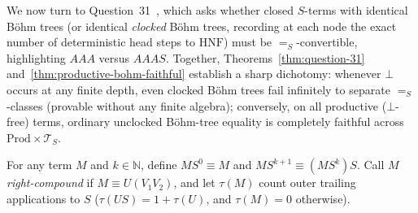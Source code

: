 \documentclass[11pt,reqno]{amsart}
\numberwithin{equation}{section}
\theoremstyle{plain}
\theoremstyle{definition}
\theoremstyle{remark}
\newcommand{\TS}{\mathcal{T}_S}
\newcommand{\HNF}{\mathrm{HNF}}
\newcommand{\Prod}{\mathrm{Prod}}
\newcommand{\convS}{=_S}
\begin{document}
We now turn to Question~31~\cite[p.~93]{BarendregtEndrullisKlopWaldmann2017}, which asks whether closed $S$-terms with identical B\"ohm trees (or identical \emph{clocked} B\"ohm trees, recording at each node the exact number of deterministic head steps to $\HNF$) must be $\convS$-convertible, highlighting $A A A$ versus $A A A S$. Together, Theorems~\ref{thm:question-31} and~\ref{thm:productive-bohm-faithful} establish a sharp dichotomy: whenever $\bot$ occurs at any finite depth, even clocked B\"ohm trees fail infinitely to separate $\convS$-classes (provable without any finite algebra); conversely, on all productive ($\bot$-free) terms, ordinary unclocked B\"ohm-tree equality is completely faithful across $\Prod \times \TS$.

For any term $M$ and $k \in \mathbb{N}$, define $M S^0 \equiv M$ and $M S^{k+1} \equiv (M S^k) S$. Call $M$ \emph{right-compound} if $M \equiv U (V_1 V_2)$, and let $\tau(M)$ count outer trailing applications to $S$ ($\tau(U S) = 1 + \tau(U)$, and $\tau(M) = 0$ otherwise).
\end{document}
